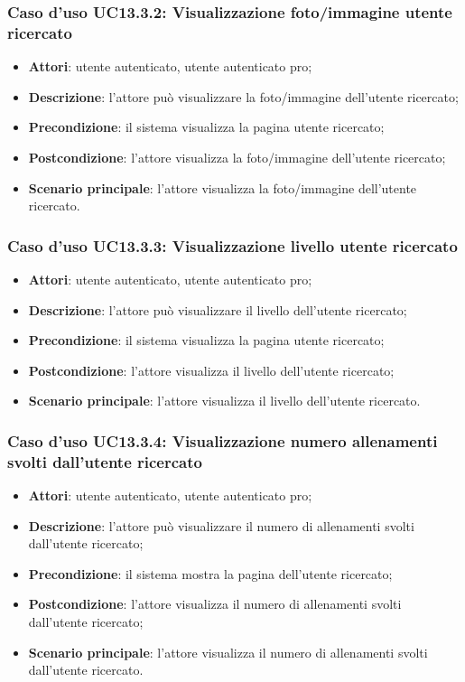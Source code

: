 \subsubsection{Caso d'uso UC13.3.2: Visualizzazione foto/immagine utente ricercato}
\begin{itemize}
	\item\textbf{Attori}: utente autenticato, utente autenticato pro;
	\item\textbf{Descrizione}: l'attore può visualizzare la foto/immagine dell'utente ricercato;
	\item\textbf{Precondizione}: il sistema visualizza la pagina utente ricercato;
	\item\textbf{Postcondizione}: l'attore visualizza la foto/immagine dell'utente ricercato;
	\item\textbf{Scenario principale}: l'attore visualizza la foto/immagine dell'utente ricercato.
\end{itemize}

\subsubsection{Caso d'uso UC13.3.3: Visualizzazione livello utente ricercato}
\begin{itemize}
	\item\textbf{Attori}: utente autenticato, utente autenticato pro;
	\item\textbf{Descrizione}: l'attore può visualizzare il livello dell'utente ricercato;
	\item\textbf{Precondizione}: il sistema visualizza la pagina utente ricercato;
	\item\textbf{Postcondizione}: l'attore visualizza il livello dell'utente ricercato;
	\item\textbf{Scenario principale}: l'attore visualizza il livello dell'utente ricercato.
\end{itemize}

\subsubsection{Caso d'uso UC13.3.4: Visualizzazione numero allenamenti svolti dall'utente ricercato}
\begin{itemize}
	\item\textbf{Attori}: utente autenticato, utente autenticato pro;
	\item\textbf{Descrizione}: l'attore può visualizzare il numero di allenamenti svolti dall'utente ricercato;
	\item\textbf{Precondizione}: il sistema mostra la pagina dell'utente ricercato;
	\item\textbf{Postcondizione}: l'attore visualizza il numero di allenamenti svolti dall'utente ricercato;
	\item\textbf{Scenario principale}: l'attore visualizza il numero di allenamenti svolti dall'utente ricercato.
\end{itemize}

